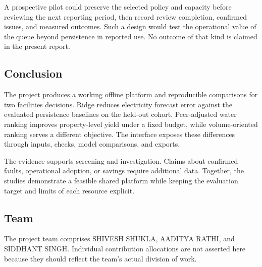 \documentclass[12pt,a4paper]{article}
\begin{document}
A prospective pilot could preserve the selected policy and capacity before reviewing the next reporting period, then record review completion, confirmed issues, and measured outcomes. Such a design would test the operational value of the queue beyond persistence in reported use. No outcome of that kind is claimed in the present report.

\subsection{Conclusion}
The project produces a working offline platform and reproducible comparisons for two facilities decisions. Ridge reduces electricity forecast error against the evaluated persistence baselines on the held-out cohort. Peer-adjusted water ranking improves property-level yield under a fixed budget, while volume-oriented ranking serves a different objective. The interface exposes these differences through inputs, checks, model comparisons, and exports.

The evidence supports screening and investigation. Claims about confirmed faults, operational adoption, or savings require additional data. Together, the studies demonstrate a feasible shared platform while keeping the evaluation target and limits of each resource explicit.

\subsection{Team}
The project team comprises SHIVESH SHUKLA, AADITYA RATHI, and SIDDHANT SINGH. Individual contribution allocations are not asserted here because they should reflect the team's actual division of work.

\newpage
\end{document}
